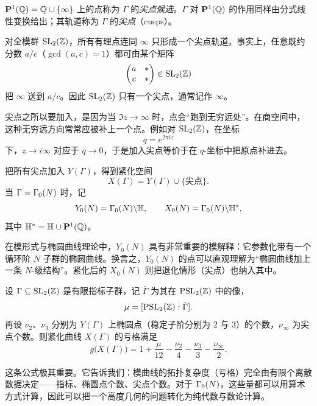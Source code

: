 \begin{definition}
$\mathbf P^1(\mathbb{Q})=\mathbb{Q}\cup\{\infty\}$ 上的点称为 $\Gamma$ 的\emph{尖点候选}。$\Gamma$ 对 $\mathbf P^1(\mathbb{Q})$ 的作用同样由分式线性变换给出；其轨道称为 $\Gamma$ 的\emph{尖点}（cusps）。
\end{definition}

\begin{example}
对全模群 $\mathrm{SL}_2(\mathbb{Z})$，所有有理点连同 $\infty$ 只形成一个尖点轨道。事实上，任意既约分数 $a/c$（$\gcd(a,c)=1$）都可由某个矩阵
\[
\begin{pmatrix} a&*\\ c&* \end{pmatrix}\in \mathrm{SL}_2(\mathbb{Z})
\]
把 $\infty$ 送到 $a/c$。因此 $\mathrm{SL}_2(\mathbb{Z})$ 只有一个尖点，通常记作 $\infty$。
\end{example}

\begin{remark}
尖点之所以要加入，是因为当 $\Im z\to\infty$ 时，点会“跑到无穷远处”。在商空间中，这种无穷远方向常常应被补上一个点。例如对 $\mathrm{SL}_2(\mathbb{Z})$，在坐标
\[
q=e^{2\pi i z}
\]
下，$z\to i\infty$ 对应于 $q\to 0$，于是加入尖点等价于在 $q$-坐标中把原点补进去。
\end{remark}

\begin{definition}
把所有尖点加入 $Y(\Gamma)$，得到紧化空间
\[
X(\Gamma)=Y(\Gamma)\cup\{\text{尖点}\}.
\]
当 $\Gamma=\Gamma_0(N)$ 时，记
\[
Y_0(N)=\Gamma_0(N)\backslash \mathbb{H},
\qquad
X_0(N)=\Gamma_0(N)\backslash \mathbb{H}^{\ast},
\]
其中 $\mathbb{H}^{\ast}=\mathbb{H}\cup \mathbf P^1(\mathbb{Q})$。
\end{definition}

\begin{remark}
在模形式与椭圆曲线理论中，$Y_0(N)$ 具有非常重要的模解释：它参数化带有一个循环阶 $N$ 子群的椭圆曲线。换言之，$Y_0(N)$ 的点可以直观理解为“椭圆曲线加上一条 $N$-级结构”。紧化后的 $X_0(N)$ 则把退化情形（尖点）也纳入其中。
\end{remark}

\begin{theorem}[亏格公式，陈述]
设 $\Gamma\subseteq \mathrm{SL}_2(\mathbb{Z})$ 是有限指标子群，记 $\bar\Gamma$ 为其在 $\mathrm{PSL}_2(\mathbb{Z})$ 中的像，
\[
\mu=[\mathrm{PSL}_2(\mathbb{Z}):\bar\Gamma].
\]
再设 $\nu_2$、$\nu_3$ 分别为 $Y(\Gamma)$ 上椭圆点（稳定子阶分别为 $2$ 与 $3$）的个数，$\nu_{\infty}$ 为尖点个数。则紧化曲线 $X(\Gamma)$ 的亏格满足
\[
g\bigl(X(\Gamma)\bigr)=1+\frac{\mu}{12}-\frac{\nu_2}{4}-\frac{\nu_3}{3}-\frac{\nu_{\infty}}{2}.
\]
\end{theorem}

\begin{remark}
这条公式极其重要。它告诉我们：模曲线的拓扑复杂度（亏格）完全由有限个离散数据决定——指标、椭圆点个数、尖点个数。对于 $\Gamma_0(N)$，这些量都可以用算术方式计算，因此可以把一个高度几何的问题转化为纯代数与数论计算。
\end{remark}

